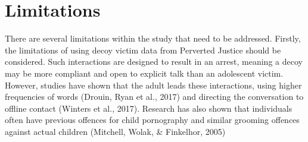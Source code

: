 \section{Limitations}



There are several limitations within the study that need to be addressed. Firstly, the limitations of using decoy victim data from
Perverted Justice should be considered. Such interactions are designed to result in an arrest, meaning a decoy may be more compliant
and open to explicit talk than an adolescent victim. However, studies have shown that the adult leads these interactions, using higher
frequencies of words (Drouin, Ryan et al., 2017) and directing the conversation to offline contact (Winters et al., 2017). Research has
also shown that individuals often have previous offences for child pornography and similar grooming offences against actual children
(Mitchell, Wolak, \& Finkelhor, 2005) \cite{broome2020psycholinguistic}










